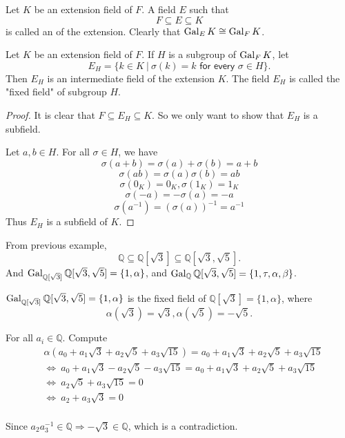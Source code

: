 \begin{definition}
    Let $K$ be an extension field of $F$. A field $E$ such that
    \[
        F \subseteq E \subseteq K
    \]
    is called an  of the extension. Clearly 
    that $\operatorname{Gal}_E K \cong \operatorname{Gal}_F K$.
\end{definition}

\begin{theorem}
    Let $K$ be an extension field of $F$. If $H$ is a subgroup of $\operatorname{Gal}_F K$, let 
    \[
        E_H = \{ k \in K \> | \> \sigma(k)=k \textsf{ for every } \sigma \in H \}.
    \]
    Then $E_H$ is an intermediate field of the extension $K$. The field $E_H$ is called 
    the "fixed field" of subgroup $H$.
\end{theorem}
\begin{proof}
    It is clear that $F \subseteq E_H \subseteq K$. So we only want to show that $E_H$ is a subfield.

    Let $a,b \in H$. For all $\sigma \in H$, we have 
    \[
        \sigma(a + b) = \sigma(a) + \sigma(b) = a+b
    \]
    \[
        \sigma(ab) = \sigma(a) \sigma(b) = ab
    \]
    \[
        \sigma(0_K) = 0_K, \sigma(1_K) = 1_K
    \]
    \[
        \sigma(-a) = - \sigma(a) = -a
    \]
    \[
        \sigma(a^{-1}) =\left( \sigma(a)\right)^{-1} = a^{-1}
    \]
    Thus $E_H$ is a subfield of $K$.
\end{proof}

\begin{example}
    From previous example,
    \[
        \mathbb{Q} \subseteq \mathbb{Q}[\sqrt{3}] \subseteq \mathbb{Q}[\sqrt{3}, \sqrt{5}].
    \]
    And $\operatorname{Gal}_{\mathbb{Q}[\sqrt{3}]} \mathbb{Q}[\sqrt{3}, \sqrt{5}] = \{ 1, \alpha \}$, 
    and $\operatorname{Gal}_{\mathbb{Q}} \mathbb{Q}[\sqrt{3}, \sqrt{5}] = \{1, \tau, \alpha, \beta \}$.
\end{example}

\begin{example}
    $\operatorname{Gal}_{\mathbb{Q}[\sqrt{3}]} \mathbb{Q}[\sqrt{3}, \sqrt{5}] = \{ 1, \alpha \}$ is the fixed 
    field of $\mathbb{Q}[\sqrt{3}] = \{ 1, \alpha \}$, where 
    \[
        \alpha(\sqrt{3}) = \sqrt{3}, \alpha(\sqrt{5}) = -\sqrt{5}.
    \]
\end{example}
\begin{solution}
    For all $a_i \in \mathbb{Q}$. Compute
    \begin{align*}
        &\alpha (a_0 + a_1 \sqrt{3} + a_2 \sqrt{5} + a_3 \sqrt{15}) = a_0 + a_1 \sqrt{3} + a_2 \sqrt{5} + a_3 \sqrt{15}\\
        &\Longleftrightarrow \> a_0 + a_1 \sqrt{3} - a_2 \sqrt{5} - a_3 \sqrt{15} = a_0 + a_1 \sqrt{3} + a_2 \sqrt{5} + a_3 \sqrt{15}\\
        &\Longleftrightarrow \> a_2 \sqrt{5} + a_3 \sqrt{15} = 0\\
        &\Longleftrightarrow \> a_2 + a_3 \sqrt{3} = 0\\
    \end{align*}
    
    Since $a_2a^{-1}_3 \in \mathbb{Q} \Longrightarrow -\sqrt{3} \in \mathbb{Q}$, which is a contradiction. 
\end{solution}

